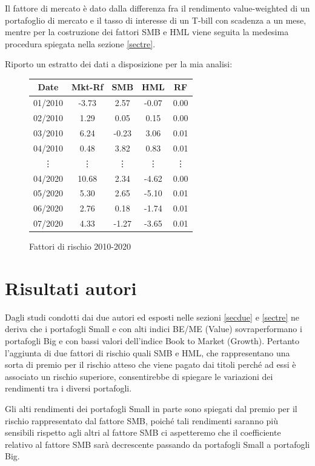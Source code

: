 Il fattore di mercato è dato dalla differenza fra il rendimento value-weighted di un portafoglio di mercato e il tasso di interesse di un T-bill con scadenza a un mese, mentre per la costruzione dei fattori SMB e HML viene seguita la medesima procedura spiegata nella sezione \ref{sectre}. 

Riporto un estratto dei dati a disposizione per la mia analisi:
\begin{figure}[h]
	\begin{center}
	\begin{tabular}{c c c c c}
		\toprule
		Date          & Mkt-Rf        &   SMB & HML & RF\\
		\midrule
		01/2010 & -3.73	&2.57 & -0.07 & 0.00 \\
		02/2010 & 	1.29 &0.05 & 	0.15 & 	0.00\\
		03/2010 & 	6.24 & -0.23 & 	3.06 & 	0.01\\
		04/2010 & 0.48 & 	3.82 &	0.83 & 	0.01\\ 
		\vdots & \vdots & \vdots & \vdots & \vdots \\
		04/2020 & 10.68 & 2.34&-4.62& 0.00\\
		05/2020 & 5.30 & 2.65 & -5.10 &0.01\\
		06/2020& 2.76 &0.18&-1.74&0.01\\
		07/2020& 4.33 &-1.27 &  -3.65&0.01\\ \hline
	\end{tabular}
	\caption{Fattori di rischio 2010-2020}
	\label{tab:truthTables}   
\end{center}
\end{figure}
\section{Risultati autori}

Dagli studi condotti dai due autori ed esposti nelle sezioni \ref{secdue} e \ref{sectre} ne deriva che i portafogli Small e con alti indici BE/ME (Value) sovraperformano i portafogli Big e con bassi valori dell'indice Book to Market (Growth). Pertanto l'aggiunta di due fattori di rischio quali SMB e HML, che rappresentano una sorta di premio per il rischio atteso che viene pagato dai titoli perché ad essi è associato un rischio superiore, consentirebbe di spiegare le variazioni dei rendimenti tra i diversi portafogli. 

Gli alti rendimenti dei portafogli Small in parte sono spiegati dal premio per il rischio rappresentato dal fattore SMB, poiché tali rendimenti saranno più sensibili rispetto agli altri al fattore SMB ci aspetteremo che il coefficiente relativo al fattore SMB sarà decrescente passando da portafogli Small a portafogli Big. 

